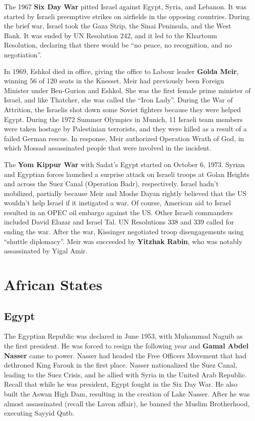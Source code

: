 The 1967 \textbf{Six Day War} pitted Israel against Egypt, Syria, and Lebanon.
It was started by Israeli preemptive strikes on airfields in the opposing countries.
During the brief war, Israel took the Gaza Strip, the Sinai Peninsula, and the West Bank.
It was ended by UN Resolution 242, and it led to the Khartoum Resolution,
declaring that there would be ``no peace, no recognition, and no negotiation''.

In 1969, Eshkol died in office, giving the office to Labour leader \textbf{Golda Meir},
winning 56 of 120 seats in the Knesset.
Meir had previously been Foreign Minister under Ben-Gurion and Eshkol.
She was the first female prime minister of Israel, and like Thatcher, she was called the ``Iron Lady''.
During the War of Attrition, the Israelis shot down some Soviet fighters because they were helped Egypt.
During the 1972 Summer Olympics in Munich, 11 Israeli team members were taken hostage by Palestinian terrorists,
and they were killed as a result of a failed German rescue.
In response, Meir authorized Operation Wrath of God,
in which Mossad assassinated people that were involved in the incident.

The \textbf{Yom Kippur War} with Sadat's Egypt started on October 6, 1973.
Syrian and Egyptian forces launched a surprise attack on Israeli troops
at Golan Heights and across the Suez Canal (Operation Badr), respectively.
Israel hadn't mobilized, partially because Meir and Moshe Dayan rightly believed
that the US wouldn't help Israel if it instigated a war.
Of course, American aid to Israel resulted in an OPEC oil embargo against the US\@.
Other Israeli commanders included David Elazar and Israel Tal.
UN Resolutions 338 and 339 called for ending the war.
After the war, Kissinger negotiated troop disengagements using ``shuttle diplomacy''.
Meir was succeeded by \textbf{Yitzhak Rabin}, who was notably assassinated by Yigal Amir.

\section{African States}

\subsection*{Egypt}

The Egyptian Republic was declared in June 1953, with Muhammad Naguib as the first president.
He was forced to resign the following year and \textbf{Gamal Abdel Nasser} came to power.
Nasser had headed the Free Officers Movement that had dethroned King Farouk in the first place.
Nasser nationalized the Suez Canal, leading to the Suez Crisis,
and he allied with Syria in the United Arab Republic.
Recall that while he was president, Egypt fought in the Six Day War.
He also built the Aswan High Dam, resulting in the creation of Lake Nasser.
After he was almost assassinated (recall the Lavon affair), he banned the Muslim Brotherhood,
executing Sayyid Qutb.

